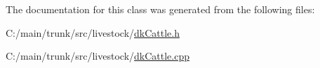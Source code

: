 The documentation for this class was generated from the following files:\begin{DoxyCompactItemize}
\item 
C:/main/trunk/src/livestock/\hyperlink{dk_cattle_8h}{dkCattle.h}\item 
C:/main/trunk/src/livestock/\hyperlink{dk_cattle_8cpp}{dkCattle.cpp}\end{DoxyCompactItemize}
